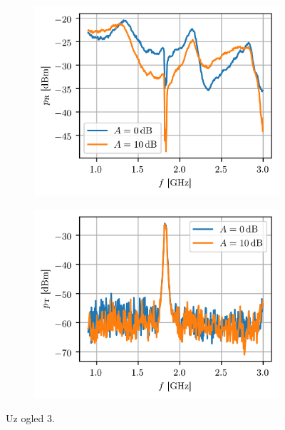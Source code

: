 \documentclass[a4paper, 12pt, diplomski]{etf}
\begin{document}
\begin{figure}
    \begin{subfigure}[b]{0.49\textwidth}
        \centering
        \includegraphics[width = 1\textwidth]{fig/pR_bpf.png}
        \label{fig:pR_bpf}
    \end{subfigure}
    \begin{subfigure}[b]{0.49\textwidth}
        \centering
        \includegraphics[width = 1\textwidth]{fig/pT_bpf.png}
        \label{fig:pT_bpf}
    \end{subfigure}  
    \caption{Uz ogled 3.}
    \label{fig:ogled3}
\end{figure}
\end{document}
